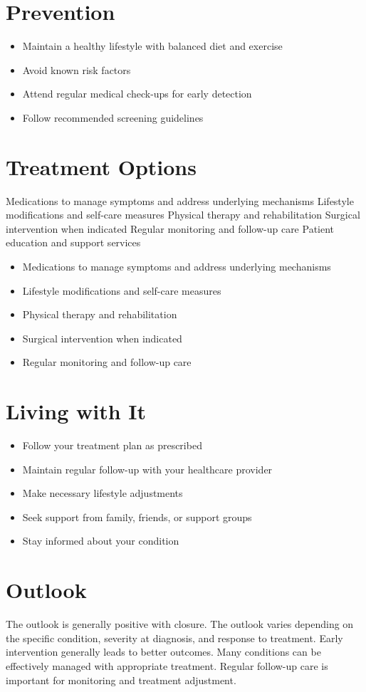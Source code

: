 \section{Prevention}
\begin{itemize}[noitemsep]
  \item Maintain a healthy lifestyle with balanced diet and exercise
  \item Avoid known risk factors
  \item Attend regular medical check-ups for early detection
  \item Follow recommended screening guidelines
\end{itemize}
\section{Treatment Options}
Medications to manage symptoms and address underlying mechanisms Lifestyle modifications and self-care measures Physical therapy and rehabilitation Surgical intervention when indicated Regular monitoring and follow-up care Patient education and support services

\begin{itemize}[noitemsep]
  \item Medications to manage symptoms and address underlying mechanisms
  \item Lifestyle modifications and self-care measures
  \item Physical therapy and rehabilitation
  \item Surgical intervention when indicated
  \item Regular monitoring and follow-up care
\end{itemize}
\section{Living with It}
\begin{itemize}[noitemsep]
  \item Follow your treatment plan as prescribed
  \item Maintain regular follow-up with your healthcare provider
  \item Make necessary lifestyle adjustments
  \item Seek support from family, friends, or support groups
  \item Stay informed about your condition
\end{itemize}
\section{Outlook}
The outlook is generally positive with closure. The outlook varies depending on the specific condition, severity at diagnosis, and response to treatment. Early intervention generally leads to better outcomes. Many conditions can be effectively managed with appropriate treatment. Regular follow-up care is important for monitoring and treatment adjustment.
